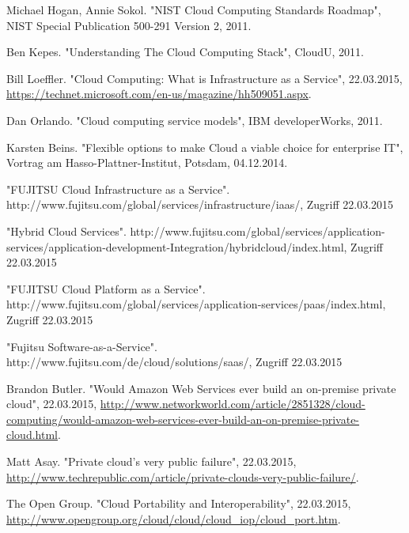 \ifCLASSOPTIONcaptionsoff
  \newpage
\fi


\begin{thebibliography}{1}

Michael Hogan, Annie Sokol. "NIST Cloud Computing Standards Roadmap", NIST Special Publication 500-291 Version 2, 2011.

Ben Kepes. "Understanding The Cloud Computing Stack", CloudU, 2011.

Bill Loeffler. "Cloud Computing: What is Infrastructure as a Service", 22.03.2015, \url{https://technet.microsoft.com/en-us/magazine/hh509051.aspx}.

Dan Orlando. "Cloud computing service models", IBM developerWorks, 2011.

Karsten Beins. "Flexible options to make Cloud a viable choice for enterprise IT", Vortrag am Hasso-Plattner-Institut, Potsdam, 04.12.2014.

"FUJITSU Cloud Infrastructure as a Service". http://www.fujitsu.com/global/services/infrastructure/iaas/, Zugriff 22.03.2015

"Hybrid Cloud Services". http://www.fujitsu.com/global/services/application-services/application-development-Integration/hybridcloud/index.html, Zugriff 22.03.2015

"FUJITSU Cloud Platform as a Service". http://www.fujitsu.com/global/services/application-services/paas/index.html, Zugriff 22.03.2015

"Fujitsu Software-as-a-Service". http://www.fujitsu.com/de/cloud/solutions/saas/, Zugriff 22.03.2015

Brandon Butler. "Would Amazon Web Services ever build an on-premise private cloud", 22.03.2015, \url{http://www.networkworld.com/article/2851328/cloud-computing/would-amazon-web-services-ever-build-an-on-premise-private-cloud.html}.

Matt Asay. "Private cloud's very public failure", 22.03.2015, \url{http://www.techrepublic.com/article/private-clouds-very-public-failure/}.

The Open Group. "Cloud Portability and Interoperability", 22.03.2015, \url{http://www.opengroup.org/cloud/cloud/cloud_iop/cloud_port.htm}.


\end{thebibliography}
